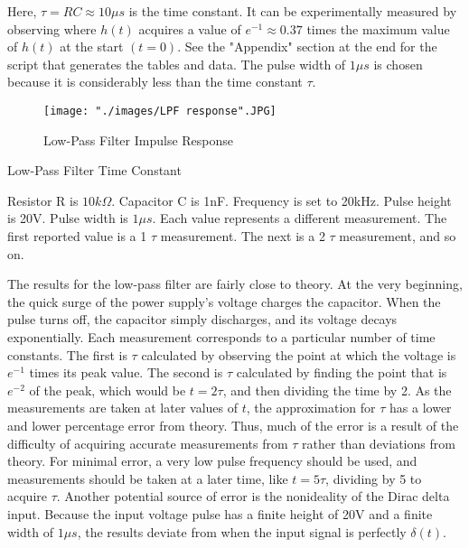\documentclass{article}
\begin{document}
	Here, $\tau = RC \approx 10\mu s$ is the time constant. It can be experimentally measured by observing where $h(t)$ acquires a value of $e^{-1} \approx 0.37$ times the maximum value of $h(t)$ at the start $(t = 0)$. See the "Appendix" section at the end for the script that generates the tables and data. The pulse width of $1\mu s$ is chosen because it is considerably less than the time constant $\tau$.
	
	
	\FloatBarrier
	
	\begin{figure}[h!]
		\centering
		\texttt{[image: "./images/LPF response".JPG]}
		\caption{Low-Pass Filter Impulse Response}
		\label{fig:lpf_response}
	\end{figure}
	
	\FloatBarrier
	
	\begin{table}[h!]
		\centering
		\caption{Low-Pass Filter Time Constant}
		\label{tab:lpf_tau}
	\end{table}
	{\footnotesize Resistor R is $10k\Omega$. Capacitor C is 1nF. Frequency is set to 20kHz. Pulse height is 20V. Pulse width is $1\mu s$. Each value represents a different measurement. The first reported value is a 1 $\tau$ measurement. The next is a 2 $\tau$ measurement, and so on.} \\
	\FloatBarrier
	
	The results for the low-pass filter are fairly close to theory. At the very beginning, the quick surge of the power supply's voltage charges the capacitor. When the pulse turns off, the capacitor simply discharges, and its voltage decays exponentially.
	Each measurement corresponds to a particular number of time constants. The first is $\tau$ calculated by observing the point at which the voltage is $e^{-1}$ times its peak value. The second is $\tau$ calculated by finding the point that is $e^{-2}$ of the peak, which would be $t = 2\tau$, and then dividing the time by 2. As the measurements are taken at later values of $t$, the approximation for $\tau$ has a lower and lower percentage error from theory. Thus, much of the error is a result of the difficulty of acquiring accurate measurements from $\tau$ rather than deviations from theory. For minimal error, a very low pulse frequency should be used, and measurements should be taken at a later time, like $t=5\tau$, dividing by 5 to acquire $\tau$.
	Another potential source of error is the nonideality of the Dirac delta input. Because the input voltage pulse has a finite height of 20V and a finite width of $1\mu s$, the results deviate from when the input signal is perfectly $\delta(t)$.
	
\end{document}
